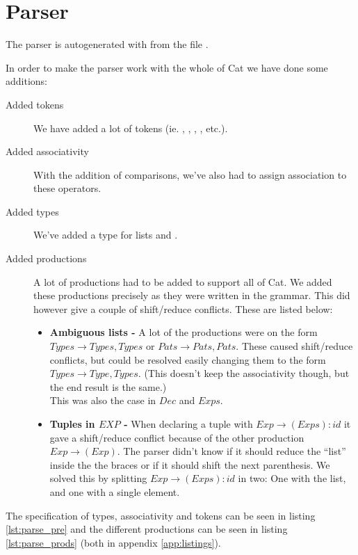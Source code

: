 \chapter{Parser}
The parser is autogenerated with  from the file 
.

In order to make the parser work with the whole of Cat we have done some
additions:

\begin{description}
\item [Added tokens] We have added a lot of tokens (ie. ,
        , , , etc.).
\item [Added associativity] With the addition of comparisons, we've also had
        to assign association to these operators.
\item [Added types] We've added a type for  lists and
        .
\item [Added productions] A lot of productions had to be added to support all
        of Cat. We added these productions precisely as they were written in
        the grammar. This did however give a couple of shift/reduce conflicts.
        These are listed below:
        \begin{itemize}
        \item \textbf{Ambiguous lists -} A lot of the productions were on the
                form $Types \to Types , Types$ or $Pats \to Pats , Pats$.
                These caused shift/reduce conflicts, but could be resolved
                easily changing them to the form $Types \to Type , Types$.
                (This doesn't keep the associativity though, but the end result
                is the same.)\\
                This was also the case in $Dec$ and $Exps$.
        \item \textbf{Tuples in $EXP$ -} When declaring a tuple with
                $Exp \to ( Exps ) : id$ it gave a shift/reduce conflict because
                of the other production $Exp\to ( Exp )$. The parser didn't
                know if it should reduce the ``list'' inside the the braces or
                if it should shift the next parenthesis. We solved this by
                splitting $Exp \to ( Exps ) : id$ in two: One with the list,
                and one with a single element.
        \end{itemize}
\end{description}

The specification of types, associativity and tokens can be seen in listing
\ref{lst:parse_pre} and the different productions can be seen in listing
\ref{lst:parse_prods} (both in appendix \ref{app:listings}).
